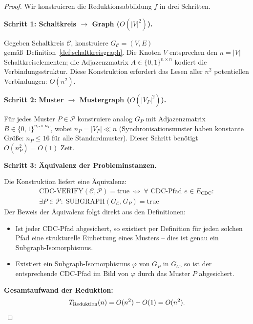 ﻿\documentclass[a4paper,12pt]{article}
\theoremstyle{definition}
\begin{document}
	\begin{proof}
		Wir konstruieren die Reduktionsabbildung $f$ in drei Schritten.
		
		\medskip
		\textbf{Schritt 1: Schaltkreis $\rightarrow$ Graph ($O(|V|^2)$).}
		
		Gegeben Schaltkreis $\mathcal{C}$, konstruiere $G_{\mathcal{C}} = (V, E)$ gem\"a\ss\
		Definition~\ref{def:schaltkreisgraph}. Die Knoten $V$ entsprechen den
		$n = |V|$ Schaltkreiselementen; die Adjazenzmatrix $A \in \{0,1\}^{n \times n}$
		kodiert die Verbindungsstruktur. Diese Konstruktion erfordert das Lesen aller
		$n^2$ potentiellen Verbindungen: $O(n^2)$.
		
		\medskip
		\textbf{Schritt 2: Muster $\rightarrow$ Mustergraph ($O(|V_P|^2)$).}
		
		F\"ur jedes Muster $P \in \mathcal{P}$ konstruiere analog $G_P$
		mit Adjazenzmatrix $B \in \{0,1\}^{n_P \times n_P}$, wobei $n_P = |V_P| \ll n$
		(Synchronisationsmuster haben konstante Gr\"o\ss{}e: $n_P \leq 16$ f\"ur
		alle Standardmuster). Dieser Schritt ben\"otigt $O(n_P^2) = O(1)$ Zeit.
		
		\medskip
		\textbf{Schritt 3: \"Aquivalenz der Probleminstanzen.}
		
		Die Konstruktion liefert eine \"Aquivalenz:
		\begin{multline*}
		\mathrm{CDC\text{-}VERIFY}(\mathcal{C}, \mathcal{P}) = \mathrm{true}
		\;\Longleftrightarrow\;
		\forall \text{ CDC-Pfad } e \in E_{\mathrm{CDC}}: \\
		\exists P \in \mathcal{P}:\;
		\mathrm{SUBGRAPH}(G_{\mathcal{C}}, G_P) = \mathrm{true}
		\end{multline*}
		Der Beweis der \"Aquivalenz folgt direkt aus den Definitionen:
		\begin{itemize}
			\item[$(\Rightarrow)$] Ist jeder CDC-Pfad abgesichert, so existiert per
			Definition f\"ur jeden solchen Pfad eine strukturelle Einbettung eines
			Musters -- dies ist genau ein Subgraph-Isomorphismus.
			\item[$(\Leftarrow)$] Existiert ein Subgraph-Isomorphismus $\varphi$ von
			$G_P$ in $G_{\mathcal{C}}$, so ist der entsprechende CDC-Pfad im Bild
			von $\varphi$ durch das Muster $P$ abgesichert.
		\end{itemize}
		
		\medskip
		\textbf{Gesamtaufwand der Reduktion:}
		\[
		T_{\mathrm{Reduktion}}(n) = O(n^2) + O(1) = O(n^2). \qedhere
		\]
	\end{proof}
	
\end{document}
